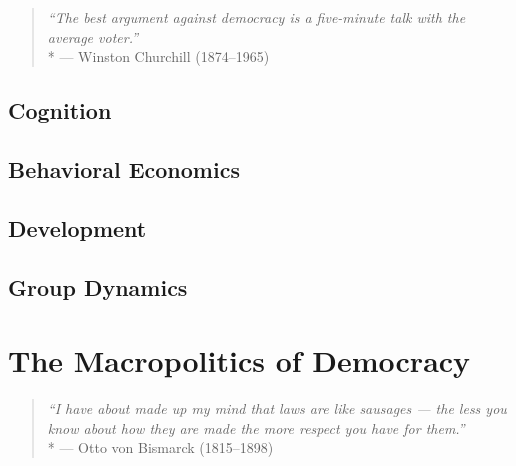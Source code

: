 \begin{quote}
	\emph{``The best argument against democracy is a five-minute talk with the average voter.''}
	\\*
	--- Winston Churchill (1874--1965)
\end{quote}


\subsection[Cognition]{Cognition}

\subsection[Behavior]{Behavioral Economics}

\subsection[Development]{Development}


\subsection[Group Dynamics]{Group Dynamics}

\section[Macropolitics]{The Macropolitics of Democracy} %

\begin{quote}
	\emph{``I have about made up my mind that laws are like sausages ---
	the less you know about how they are made the more respect you have for them.''}
	\\*
	--- Otto von Bismarck (1815--1898)
\end{quote}

